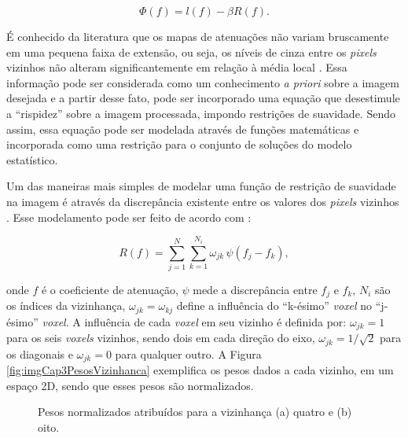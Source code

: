 {{\begin{equation}
\Phi(f) = l(f) - \beta R(f).
\label{eq:eqCap3TeoremaBayesLogSimplificadaFinal}
\end{equation}

É conhecido da literatura que os mapas de atenuações não variam bruscamente em uma pequena faixa de extensão, ou seja, os níveis de cinza entre os \textit{pixels} vizinhos não alteram significantemente em relação à média local \cite{Fessler2000handbook,buzug2008computed}. Essa informação pode ser considerada como um conhecimento \textit{a priori} sobre a imagem desejada e a partir desse fato, pode ser incorporado uma equação que desestimule a ``rispidez'' sobre a imagem processada, impondo restrições de suavidade. Sendo assim, essa equação pode ser modelada através de funções matemáticas e incorporada como uma restrição para o conjunto de soluções do modelo estatístico.

Um das maneiras mais simples de modelar uma função de restrição de suavidade na imagem é através da discrepância existente entre os valores dos \textit{pixels} vizinhos \cite[p. 12]{Fessler2000handbook}. Esse modelamento pode ser feito de acordo com :

\begin{equation}
R(f) = \sum_{j=1}^{N}  \sum_{k=1}^{N_{i}} \omega_{jk} \, \psi(f_{j}-f_{k}),
\label{eq:eqCap3DiscrepanciaPixels}
\end{equation}  

\noindent onde $f$ é o coeficiente de atenuação, $\psi$ mede a discrepância entre $f_{j}$ e $f_{k}$, $N_{i}$ são os índices da vizinhança, $\omega_{jk} = \omega_{kj}$ define a influência do ``k-ésimo'' \textit{voxel} no ``j-ésimo'' \textit{voxel}. A influência de cada \textit{voxel} em seu vizinho é definida por: $\omega_{jk} = 1$ para os seis \textit{voxels} vizinhos, sendo dois em cada direção do eixo, $\omega_{jk} = 1/\sqrt{2}$ para os diagonais e $\omega_{jk} = 0$ para qualquer outro. A Figura \ref{fig:imgCap3PesosVizinhanca} exemplifica os pesos dados a cada vizinho, em um espaço \acs{2D}, sendo que esses pesos são normalizados.


\begin{figure}[H]
	\centering
	
	\caption{Pesos normalizados atribuídos para a vizinhança (a) quatro e (b) oito.}
	
	

\end{figure}}}
